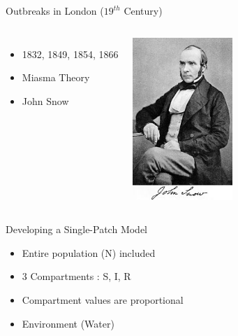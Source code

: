 \documentclass{beamer}\usepackage[]{graphicx}\usepackage[]{color}
\begin{document}
\begin{frame}{Outbreaks in London ($19^{th}$ Century)}
\begin{columns}[onlytextwidth]
\begin{itemize}
\setlength\itemsep{2em}
\item 1832, 1849, 1854, 1866
\item Miasma Theory
\item John Snow  
\end{itemize}
\includegraphics[width=0.65\textwidth]{images/Snow.jpg}
\end{columns}
\end{frame}

\begin{frame}{Developing a Single-Patch Model}
\begin{itemize}
\setlength\itemsep{2em}
\item Entire population (N) included
\item 3 Compartments : S, I, R
\item Compartment values are proportional
\item Environment (Water)
\end{itemize}
\end{frame}
\end{document}
